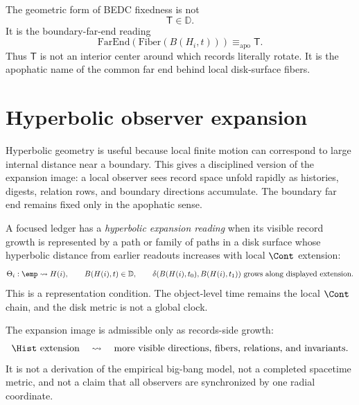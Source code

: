 \begin{principle}
\label{prin:hyperbolic-boundary-not-center}
The geometric form of BEDC fixedness is not
$$
\mathsf{T}\in\mathbb{D}.
$$
It is the boundary-far-end reading
$$
\mathrm{FarEnd}(\mathrm{Fiber}(B(H_i,t)))\equiv_{\mathrm{apo}}\mathsf{T}.
$$
Thus $\mathsf{T}$ is not an interior center around which records literally rotate. It is the apophatic name of the common far end behind local disk-surface fibers.
\end{principle}

\section{Hyperbolic observer expansion}
\label{sec:hyperbolic-observer-expansion}

Hyperbolic geometry is useful because local finite motion can correspond to large internal distance near a boundary. This gives a disciplined version of the expansion image: a local observer sees record space unfold rapidly as histories, digests, relation rows, and boundary directions accumulate. The boundary far end remains fixed only in the apophatic sense.

\begin{definition}
\label{def:hyperbolic-expansion-reading}
A focused ledger has a \emph{hyperbolic expansion reading} when its visible record growth is represented by a path or family of paths in a disk surface whose hyperbolic distance from earlier readouts increases with local $\Cont$ extension:
$$
\Theta_i : \emp \leadsto H(i),
\qquad
B(H(i),t)\in\mathbb{D},
\qquad
\delta(B(H(i),t_0),B(H(i),t_1)) \text{ grows along displayed extension.}
$$
This is a representation condition. The object-level time remains the local $\Cont$ chain, and the disk metric is not a global clock.
\end{definition}

\begin{principle}
\label{prin:hyperbolic-explosion-records-side}
The expansion image is admissible only as records-side growth:
$$
\Hist\text{ extension}
\quad\leadsto\quad
\text{more visible directions, fibers, relations, and invariants}.
$$
It is not a derivation of the empirical big-bang model, not a completed spacetime metric, and not a claim that all observers are synchronized by one radial coordinate.
\end{principle}

